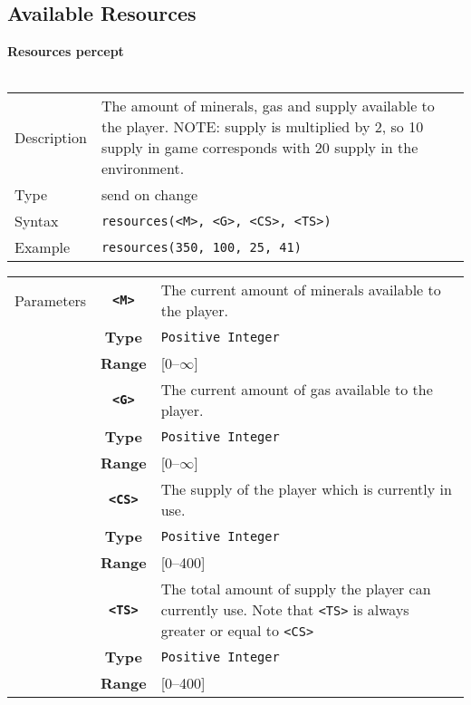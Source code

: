 \subsection{Available Resources}
\textbf{Resources percept}\\
\\
\begin{tabularx}{\textwidth}{lX}
 Description & The amount of minerals, gas and supply available to the player. NOTE: supply is multiplied by 2, so 10 supply in game corresponds with 20 supply in the environment. \\
 Type & send on change \\
 Syntax & \verb|resources(<M>, <G>, <CS>, <TS>)| \\
 Example & \verb|resources(350, 100, 25, 41)| \\
 \end{tabularx}
 \begin{tabularx}{\textwidth}{l | c | p{8cm}|}
 \cline{2-3} 
 Parameters & \textbf{\verb|<M>|} & The current amount of minerals available to the player. \\
            & \textbf{Type} & \verb|Positive Integer| \\
            & \textbf{Range} & [0--$\infty$] \\
            \cline{2-3} 
            & \textbf{\verb|<G>|} & The current amount of gas available to the player. \\
            & \textbf{Type} & \verb|Positive Integer| \\
            & \textbf{Range} & [0--$\infty$] \\
            \cline{2-3} 
            & \textbf{\verb|<CS>|} & The supply of the player which is currently in use. \\
            & \textbf{Type} & \verb|Positive Integer| \\
            & \textbf{Range} & [0--400] \\
            \cline{2-3} 
            & \textbf{\verb|<TS>|} & The total amount of supply the player can currently use. Note that \verb|<TS>| is always greater or equal to \verb|<CS>| \\
            & \textbf{Type} & \verb|Positive Integer| \\
            & \textbf{Range} & [0--400] \\
            \cline{2-3} 
\end{tabularx}\\
\\
\newpage

